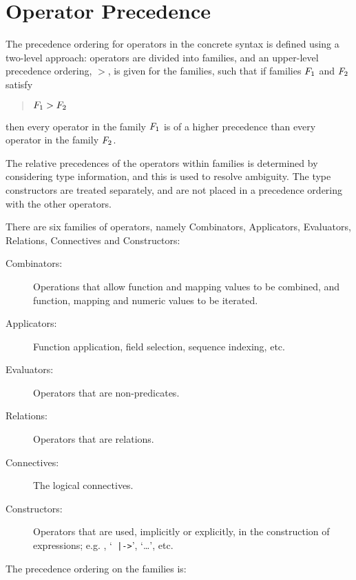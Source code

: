 \documentclass[\pformat,12pt]{article}
\begin{document}
\newpage
\section{Operator Precedence}\label{app-c}

The precedence ordering for operators in the concrete syntax is defined
using a two-level approach: operators are divided into families, and an
upper-level precedence ordering, $>$, is given for the families, such that
if families $F\sb{1}$ and $F\sb{2}$ satisfy

\begin{quote}
$F\sb{1} > F\sb{2}$
\end{quote}

\noindent then every operator in the family $F\sb{1}$ is of a higher precedence
than every operator in the family $F\sb{2}$.

The relative precedences of the operators within families is determined by
considering type information, and this is used to resolve ambiguity. The
type constructors are treated separately, and are not placed in a
precedence ordering with the other operators.

There are six families of operators, namely Combinators, Applicators,
Evaluators, Relations, Connectives and Constructors:

\begin{description}%
\item[Combinators:] Operations that allow function and mapping values to be
  combined, and function, mapping and numeric values to be iterated.

\item[Applicators:] Function application, field selection, sequence
  indexing, etc.

\item[Evaluators:] Operators that are non-predicates.

\item[Relations:] Operators that are relations.

\item[Connectives:] The logical connectives.

\item[Constructors:] Operators that are used, implicitly or explicitly, in
  the construction of expressions; e.g.  , `{\tt
    |->}', `\ldots', etc.
\end{description}

\noindent The precedence ordering on the families is:
\end{document}
